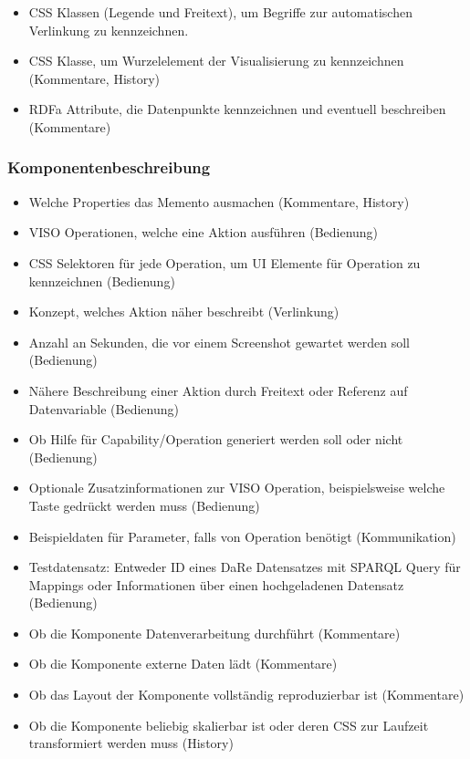 \documentclass[
	headsepline,
	footsepline,
	fontsize=12pt,
	bibliography=totoc
]{scrbook}
\begin{document}
\begin{itemize}
	\item CSS Klassen (Legende und Freitext), um Begriffe zur automatischen Verlinkung zu kennzeichnen.
	\item CSS Klasse, um Wurzelelement der Visualisierung zu kennzeichnen (Kommentare, History)
	\item RDFa Attribute, die Datenpunkte kennzeichnen und eventuell beschreiben (Kommentare)
\end{itemize}

\subsubsection{Komponentenbeschreibung}

\begin{itemize}
	\item Welche Properties das Memento ausmachen (Kommentare, History)
	\item VISO Operationen, welche eine Aktion ausführen (Bedienung)
	\item CSS Selektoren für jede Operation, um UI Elemente für Operation zu kennzeichnen (Bedienung)
	\item Konzept, welches Aktion näher beschreibt (Verlinkung)
	\item Anzahl an Sekunden, die vor einem Screenshot gewartet werden soll (Bedienung)
	\item Nähere Beschreibung einer Aktion durch Freitext oder Referenz auf Datenvariable (Bedienung)
	\item Ob Hilfe für Capability/Operation generiert werden soll oder nicht (Bedienung)
	\item Optionale Zusatzinformationen zur VISO Operation, beispielsweise welche Taste gedrückt werden muss (Bedienung)
	\item Beispieldaten für Parameter, falls von Operation benötigt (Kommunikation)
	\item Testdatensatz: Entweder ID eines DaRe Datensatzes mit SPARQL Query für Mappings oder Informationen über einen hochgeladenen Datensatz (Bedienung)
	\item Ob die Komponente Datenverarbeitung durchführt (Kommentare)
	\item Ob die Komponente externe Daten lädt (Kommentare)
	\item Ob das Layout der Komponente vollständig reproduzierbar ist (Kommentare)
	\item Ob die Komponente beliebig skalierbar ist oder deren CSS zur Laufzeit transformiert werden muss (History)
\end{itemize}
\end{document}
